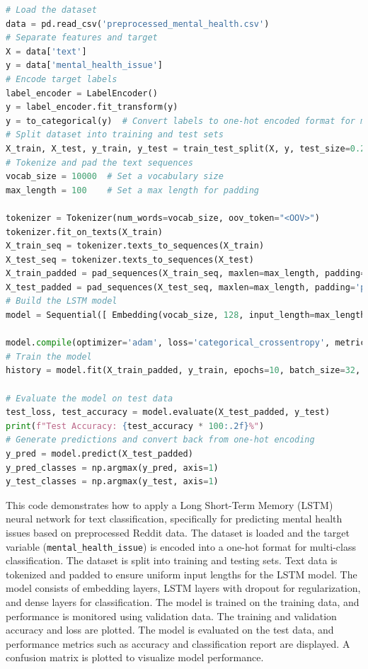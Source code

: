\begin{tcolorbox}[colback=gray!5!white, colframe=gray!80!black, boxrule=0.5pt, title=LSTM Model Implementation]
    \begin{lstlisting}[language=Python]
# Load the dataset
data = pd.read_csv('preprocessed_mental_health.csv')
# Separate features and target
X = data['text']
y = data['mental_health_issue']
# Encode target labels
label_encoder = LabelEncoder()
y = label_encoder.fit_transform(y)
y = to_categorical(y)  # Convert labels to one-hot encoded format for multi-class classification
# Split dataset into training and test sets
X_train, X_test, y_train, y_test = train_test_split(X, y, test_size=0.2, random_state=42)
# Tokenize and pad the text sequences
vocab_size = 10000  # Set a vocabulary size
max_length = 100    # Set a max length for padding

tokenizer = Tokenizer(num_words=vocab_size, oov_token="<OOV>")
tokenizer.fit_on_texts(X_train)
X_train_seq = tokenizer.texts_to_sequences(X_train)
X_test_seq = tokenizer.texts_to_sequences(X_test)
X_train_padded = pad_sequences(X_train_seq, maxlen=max_length, padding='post', truncating='post')
X_test_padded = pad_sequences(X_test_seq, maxlen=max_length, padding='post', truncating='post')
# Build the LSTM model
model = Sequential([ Embedding(vocab_size, 128, input_length=max_length), LSTM(128,eturn_sequences=True), Dropout(0.2), LSTM(64), Dropout(0.2), Dense(64,activation='relu'), Dense(y.shape[1],activation='softmax')])

model.compile(optimizer='adam', loss='categorical_crossentropy', metrics=['accuracy'])
# Train the model
history = model.fit(X_train_padded, y_train, epochs=10, batch_size=32, validation_data=(X_test_padded, y_test))

# Evaluate the model on test data
test_loss, test_accuracy = model.evaluate(X_test_padded, y_test)
print(f"Test Accuracy: {test_accuracy * 100:.2f}%")
# Generate predictions and convert back from one-hot encoding
y_pred = model.predict(X_test_padded)
y_pred_classes = np.argmax(y_pred, axis=1)
y_test_classes = np.argmax(y_test, axis=1)
\end{lstlisting}
\end{tcolorbox}

\noindent
This code demonstrates how to apply a Long Short-Term Memory (LSTM) neural network for text classification, specifically for predicting mental health issues based on preprocessed Reddit data. The dataset is loaded and the target variable (\texttt{mental\_health\_issue}) is encoded into a one-hot format for multi-class classification. The dataset is split into training and testing sets. Text data is tokenized and padded to ensure uniform input lengths for the LSTM model. The model consists of embedding layers, LSTM layers with dropout for regularization, and dense layers for classification. The model is trained on the training data, and performance is monitored using validation data. The training and validation accuracy and loss are plotted. The model is evaluated on the test data, and performance metrics such as accuracy and classification report are displayed. A confusion matrix is plotted to visualize model performance.

